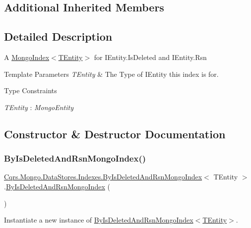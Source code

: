 \subsection*{Additional Inherited Members}


\subsection{Detailed Description}
A \hyperlink{classCqrs_1_1Mongo_1_1DataStores_1_1Indexes_1_1MongoIndex_a7affbb063520cd8c8bda27f8478efd06_a7affbb063520cd8c8bda27f8478efd06}{Mongo\+Index$<$\+T\+Entity$>$} for I\+Entity.\+Is\+Deleted and I\+Entity.\+Rsn 


\begin{DoxyTemplParams}{Template Parameters}
{\em T\+Entity} & The Type of I\+Entity this index is for.\\
\hline
\end{DoxyTemplParams}
\begin{Desc}
\item[Type Constraints]\begin{description}
\item[{\em T\+Entity} : {\em Mongo\+Entity}]\end{description}
\end{Desc}


\subsection{Constructor \& Destructor Documentation}
\mbox{\label{classCqrs_1_1Mongo_1_1DataStores_1_1Indexes_1_1ByIsDeletedAndRsnMongoIndex_ac8d7d3e7eadc2080041196f33e878da2_ac8d7d3e7eadc2080041196f33e878da2}} 
\subsubsection{\texorpdfstring{By\+Is\+Deleted\+And\+Rsn\+Mongo\+Index()}{ByIsDeletedAndRsnMongoIndex()}}
{\footnotesize\ttfamily \hyperlink{classCqrs_1_1Mongo_1_1DataStores_1_1Indexes_1_1ByIsDeletedAndRsnMongoIndex}{Cqrs.\+Mongo.\+Data\+Stores.\+Indexes.\+By\+Is\+Deleted\+And\+Rsn\+Mongo\+Index}$<$ T\+Entity $>$.\hyperlink{classCqrs_1_1Mongo_1_1DataStores_1_1Indexes_1_1ByIsDeletedAndRsnMongoIndex}{By\+Is\+Deleted\+And\+Rsn\+Mongo\+Index} (\begin{DoxyParamCaption}{ }\end{DoxyParamCaption})\hspace{0.3cm}{\ttfamily [protected]}}



Instantiate a new instance of \hyperlink{classCqrs_1_1Mongo_1_1DataStores_1_1Indexes_1_1ByIsDeletedAndRsnMongoIndex_ac8d7d3e7eadc2080041196f33e878da2_ac8d7d3e7eadc2080041196f33e878da2}{By\+Is\+Deleted\+And\+Rsn\+Mongo\+Index$<$\+T\+Entity$>$}. 

